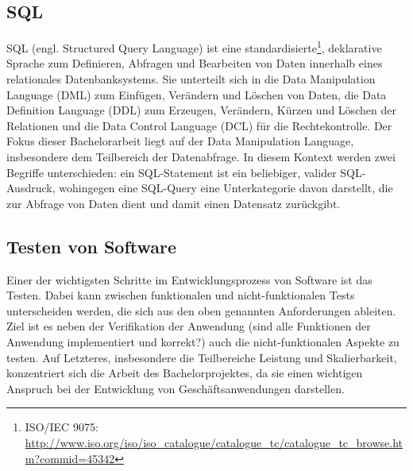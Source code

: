 \subsection{SQL}
SQL (engl. Structured Query Language) \cite{DBLP:books/aw/DateD97} ist eine standardisierte\footnote{ISO/IEC 9075: \url{http://www.iso.org/iso/iso_catalogue/catalogue_tc/catalogue_tc_browse.htm?commid=45342}}, deklarative Sprache zum Definieren, Abfragen und Bearbeiten von Daten innerhalb eines relationales Datenbanksystems.
Sie unterteilt sich in die Data Manipulation Language (DML) zum Einfügen, Verändern und Löschen von Daten, die Data Definition Language (DDL) zum Erzeugen, Verändern, Kürzen und Löschen der Relationen und die Data Control Language (DCL) für die Rechtekontrolle.
Der Fokus dieser Bachelorarbeit liegt auf der Data Manipulation Language, insbesondere dem Teilbereich der Datenabfrage.
In diesem Kontext werden zwei Begriffe unterschieden: ein SQL-Statement ist ein beliebiger, valider SQL-Ausdruck, wohingegen eine SQL-Query eine Unterkategorie davon darstellt, die zur Abfrage von Daten dient und damit einen Datensatz zurückgibt.

\subsection{Testen von Software}
Einer der wichtigsten Schritte im Entwicklungsprozess von Software ist das Testen.
Dabei kann zwischen funktionalen und nicht-funktionalen Tests unterscheiden werden, die sich aus den oben genannten Anforderungen ableiten.
Ziel ist es neben der Verifikation der Anwendung (sind alle Funktionen der Anwendung implementiert und korrekt?) auch die nicht-funktionalen Aspekte zu testen.
Auf Letzteres, insbesondere die Teilbereiche Leistung und Skalierbarkeit, konzentriert sich die Arbeit des Bachelorprojektes, da sie einen wichtigen Anspruch bei der Entwicklung von Geschäftsanwendungen darstellen.

